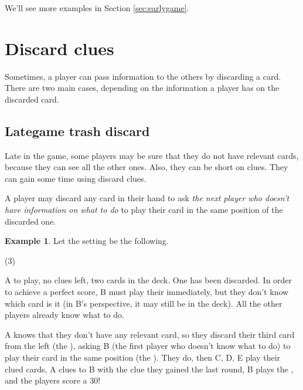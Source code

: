 \documentclass[a4paper]{article}
\theoremstyle{plain}
\theoremstyle{definition}
\newtheorem{example}[theorem]{Example}
\begin{document}
We'll see more examples in Section \ref{sec:earlygame}.

\section{Discard clues}

Sometimes, a player can pass information to the others by discarding a card. There are two main cases, depending on the information a player has on the discarded card.

%
%

\subsection{Lategame trash discard}

Late in the game, some players may be sure that they do not have relevant cards, because they can see all the other ones. Also, they can be short on clues. They can gain some time using discard clues.

A player may discard any card in their hand to ask \textit{the next player who doesn't have information on what to do} to play their card in the same position of the discarded one.

\begin{example}
	
	Let the setting be the following.
	
	\begin{tasks}(3)
		\task[+]      
		\task[A]    
		\task[B]    
		\task[C]    
		\task[D]    
		\task[E]    
	\end{tasks}
	
	A to play, no clues left, two cards in the deck. One  has been discarded. In order to achieve a perfect score, B must play their  immediately, but they don't know which card is it (in B's perspective, it may still be in the deck). All the other players already know what to do.
	
	A knows that they don't have any relevant card, so they discard their third card from the left (the ), asking B (the first player who doesn't know what to do) to play their card in the same position (the ). They do, then C, D, E play their clued cards, A clues  to B with the clue they gained the last round, B plays the , and the players score a 30!
\end{example}
\end{document}
